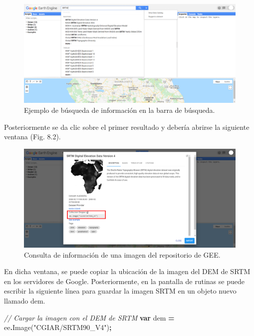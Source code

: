 \documentclass[
  12pt,
  letterpaper,
  twoside]{book}
\newenvironment{Shaded}{\begin{snugshade}}{\end{snugshade}}
\newcommand{\CommentTok}[1]{\textcolor[rgb]{0.56,0.35,0.01}{\textit{#1}}}
\newcommand{\FunctionTok}[1]{\textcolor[rgb]{0.00,0.00,0.00}{#1}}
\newcommand{\KeywordTok}[1]{\textcolor[rgb]{0.13,0.29,0.53}{\textbf{#1}}}
\newcommand{\NormalTok}[1]{#1}
\newcommand{\OperatorTok}[1]{\textcolor[rgb]{0.81,0.36,0.00}{\textbf{#1}}}
\newcommand{\StringTok}[1]{\textcolor[rgb]{0.31,0.60,0.02}{#1}}
\begin{document}
\begin{figure}[btp]

{\centering \includegraphics[width=1\linewidth]{Img/SRTM} 

}

\caption{Ejemplo de búsqueda de información en la barra de búsqueda.}\label{fig:unnamed-chunk-118}
\end{figure}

Posteriormente se da clic sobre el primer resultado y debería abrirse la siguiente ventana (Fig. 8.2).

\begin{figure}[btp]

{\centering \includegraphics[width=1\linewidth]{Img/SRTM_prop} 

}

\caption{Consulta de información de una imagen del repositorio de GEE.}\label{fig:unnamed-chunk-119}
\end{figure}

En dicha ventana, se puede copiar la ubicación de la imagen del DEM de SRTM en los servidores de Google. Posteriormente, en la pantalla de rutinas se puede escribir la siguiente línea para guardar la imagen SRTM en un objeto nuevo llamado dem.

\begin{Shaded}
\begin{Highlighting}[]
\CommentTok{// Cargar la imagen con el DEM de SRTM}
\KeywordTok{var}\NormalTok{ dem }\OperatorTok{=}\NormalTok{ ee}\OperatorTok{.}\FunctionTok{Image}\NormalTok{(}\StringTok{"CGIAR/SRTM90\_V4"}\NormalTok{)}\OperatorTok{;}
\end{Highlighting}
\end{Shaded}
\end{document}

